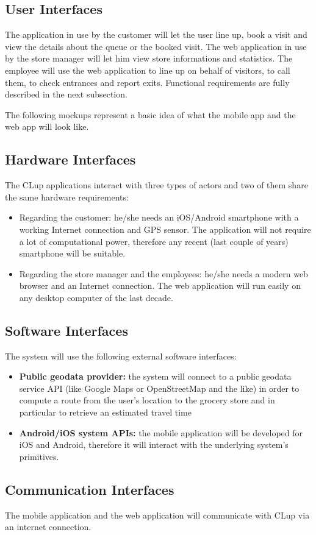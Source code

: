 \subsection{User Interfaces}
The application in use by the customer will let the user line up, book a visit and view the details about the queue or the booked visit.
The web application in use by the store manager will let him view store informations and statistics. The employee will use the web application to line up on behalf of visitors, to call them, to check entrances and report exits. Functional requirements are fully described in the next subsection. 

The following mockups represent a basic idea of what the mobile app and the web app will look like.

\subsection{Hardware Interfaces}
\label{hardware interfaces}
The CLup applications interact with three types of actors and two of them share the same hardware requirements:
\begin{itemize}
    \item Regarding the customer: he/she needs an iOS/Android smartphone with a working Internet connection and GPS sensor. The application will not require a lot of computational power, therefore any recent (last couple of years) smartphone will be suitable.
    \item Regarding the store manager and the employees: he/she needs a modern web browser and an Internet connection. The web application will run easily on any desktop computer of the last decade.
\end{itemize}

\subsection{Software Interfaces}
The system will use the following external software interfaces:
\begin{itemize}
    \item \textbf{Public geodata provider:} the system will connect to a public geodata service API (like Google Maps or OpenStreetMap and the like) in order to compute a route from the user's location to the grocery store and in particular to retrieve an estimated travel time
    \item \textbf{Android/iOS system APIs:} the mobile application will be developed for iOS and Android, therefore it will interact with the underlying system's primitives.
\end{itemize}

\subsection{Communication Interfaces}
The mobile application and the web application will communicate with CLup via an internet connection.